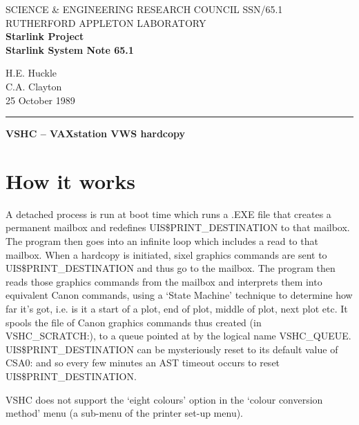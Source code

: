 
\pagestyle{myheadings}
\setlength{\textwidth}{160mm}
\setlength{\textheight}{240mm}
\setlength{\topmargin}{-5mm}
\setlength{\oddsidemargin}{0mm}
\setlength{\evensidemargin}{0mm}
\setlength{\parindent}{0mm}
\setlength{\parskip}{\medskipamount}
\setlength{\unitlength}{1mm}


\thispagestyle{empty}
SCIENCE \& ENGINEERING RESEARCH COUNCIL \hfill SSN/65.1\\
RUTHERFORD APPLETON LABORATORY\\
{\large\bf Starlink Project\\}
{\large\bf Starlink System Note 65.1}
\begin{flushright}
H.E. Huckle\\
C.A. Clayton\\
25 October 1989
\end{flushright}
\vspace{-4mm}
\rule{\textwidth}{0.5mm}
\vspace{5mm}
\begin{center}
{\Large\bf VSHC -- VAXstation VWS hardcopy}
\end{center}
\vspace{5mm}

\section{How it works}

A detached process is run at boot time which runs a .EXE file that creates a
permanent mailbox and redefines UIS\$PRINT\_DESTINATION to that mailbox. The
program then goes into an infinite loop which includes a read to that mailbox.
When a hardcopy is initiated, sixel graphics commands are sent to
UIS\$PRINT\_DESTINATION and thus go to the mailbox. The program then reads those
graphics commands from the mailbox and interprets them into equivalent Canon
commands, using a `State Machine' technique to determine how far it's got, i.e.
is it a start of a plot, end of plot, middle of plot, next plot etc. It spools
the file of Canon graphics commands thus created (in VSHC\_SCRATCH:), to a queue
pointed at by the logical name VSHC\_QUEUE. UIS\$PRINT\_DESTINATION can be
mysteriously reset to its default value of CSA0: and so every few minutes an
AST timeout occurs to reset UIS\$PRINT\_DESTINATION.

VSHC does not support the `eight colours' option in the `colour conversion
method' menu (a sub-menu of the printer set-up menu).

